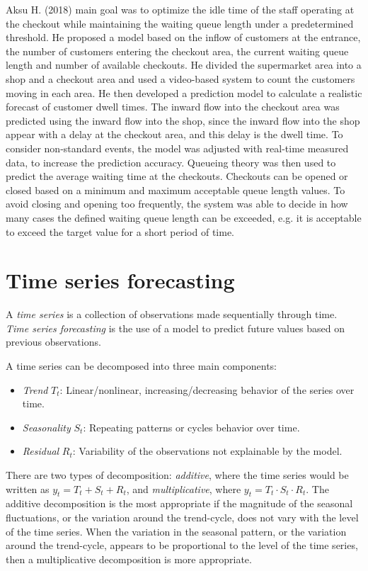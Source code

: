 Aksu H. (2018) \cite{aksu} main goal was to optimize the idle time of the staff operating at the checkout while maintaining the waiting queue length under a predetermined threshold. He proposed a model based on the inflow of customers at the entrance, the number of customers entering the checkout area, the current waiting queue length and number of available checkouts. He divided the supermarket area into a shop and a checkout area and used a video-based system to count the customers moving in each area. He then developed a prediction model to calculate a realistic forecast of customer dwell times. The inward flow into the checkout area was predicted using the inward flow into the shop, since the inward flow into the shop appear with a delay at the checkout area, and this delay is the dwell time. To consider non-standard events, the model was adjusted with real-time measured data, to increase the prediction accuracy. Queueing theory was then used to predict the average waiting time at the checkouts. Checkouts can be opened or closed based on a minimum and maximum acceptable queue length values. To avoid closing and opening too frequently, the system was able to decide in how many cases the defined waiting queue length can be exceeded, e.g. it is acceptable to exceed the target value for a short period of time.

\section{Time series forecasting}
\label{sec:time_series_forecasting}

A \emph{time series} is a collection of observations made sequentially through time. \emph{Time series forecasting} is the use of a model to predict future values based on previous observations.

A time series can be decomposed into three main components:
\begin{itemize}
  \item \emph{Trend} \( T_t \): Linear/nonlinear, increasing/decreasing behavior of the series over time.
  \item \emph{Seasonality} \( S_t \): Repeating patterns or cycles behavior over time.
  \item \emph{Residual} \( R_t \): Variability of the observations not explainable by the model.
\end{itemize}

There are two types of decomposition: \emph{additive}, where the time series would be written as \( y_t = T_t + S_t + R_t \), and \emph{multiplicative}, where \( y_t = T_t \cdot S_t \cdot R_t \).
The additive decomposition is the most appropriate if the magnitude of the seasonal fluctuations, or the variation around the trend-cycle, does not vary with the level of the time series. When the variation in the seasonal pattern, or the variation around the trend-cycle, appears to be proportional to the level of the time series, then a multiplicative decomposition is more appropriate.

